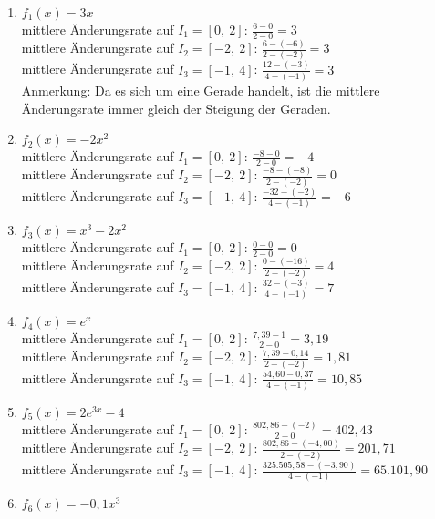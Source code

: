 \documentclass[a4paper,12pt, headsepline, ngerman]{scrartcl}
\theoremstyle{definition}
\begin{document}
\begin{Answer}[ref=grafischABlA1]
	\begin{enumerate}[label=\alph*)]
		\item \(f_1(x)=3x\)\\
		mittlere Änderungsrate auf \(I_1=[0,\ 2]\): \(\frac{6-0}{2-0}=3\)\\
		mittlere Änderungsrate auf \(I_2=[-2,\ 2]\): \(\frac{6-(-6)}{2-(-2)}=3\)\\
		mittlere Änderungsrate auf \(I_3=[-1,\ 4]\): \(\frac{12-(-3)}{4-(-1)}=3\)\\
		Anmerkung: Da es sich um eine Gerade handelt, ist die mittlere Änderungsrate immer gleich der Steigung der Geraden.
		\item \(f_2(x)=-2x^2\)\\
		mittlere Änderungsrate auf \(I_1=[0,\ 2]\): \(\frac{-8-0}{2-0}=-4\)\\
		mittlere Änderungsrate auf \(I_2=[-2,\ 2]\): \(\frac{-8-(-8)}{2-(-2)}=0\)\\
		mittlere Änderungsrate auf \(I_3=[-1,\ 4]\): \(\frac{-32-(-2)}{4-(-1)}=-6\)\\
		\item \(f_3(x)=x^3-2x^2\)\\
		mittlere Änderungsrate auf \(I_1=[0,\ 2]\): \(\frac{0-0}{2-0}=0\)\\
		mittlere Änderungsrate auf \(I_2=[-2,\ 2]\): \(\frac{0-(-16)}{2-(-2)}=4\)\\
		mittlere Änderungsrate auf \(I_3=[-1,\ 4]\): \(\frac{32-(-3)}{4-(-1)}=7\)\\
		\item \(f_4(x)=e^x\)\\
		mittlere Änderungsrate auf \(I_1=[0,\ 2]\): \(\frac{7,39-1}{2-0}=3,19\)\\
		mittlere Änderungsrate auf \(I_2=[-2,\ 2]\): \(\frac{7,39-0,14}{2-(-2)}=1,81\)\\
		mittlere Änderungsrate auf \(I_3=[-1,\ 4]\): \(\frac{54,60-0,37}{4-(-1)}=10,85\)\\
		\item \(f_5(x)=2e^{3x}-4\)\\
		mittlere Änderungsrate auf \(I_1=[0,\ 2]\): \(\frac{802,86-(-2)}{2-0}=402,43\)\\
		mittlere Änderungsrate auf \(I_2=[-2,\ 2]\): \(\frac{802,86-(-4,00)}{2-(-2)}=201,71\)\\
		mittlere Änderungsrate auf \(I_3=[-1,\ 4]\): \(\frac{325.505,58-(-3,90)}{4-(-1)}=65.101,90\)\\
		\item \(f_6(x)=-0,1x^3\)\\

\end{enumerate}
\end{Answer}
\end{document}
